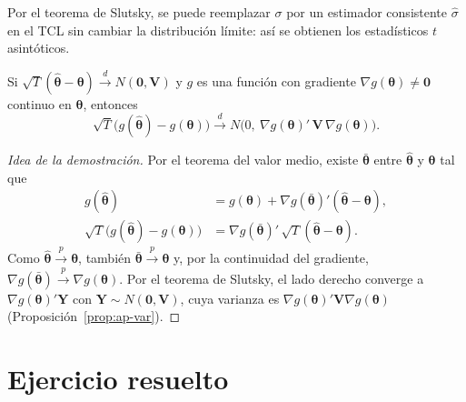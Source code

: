 Por el teorema de Slutsky, se puede reemplazar $\sigma$ por un estimador consistente $\hat\sigma$ en el
TCL sin cambiar la distribución límite: así se obtienen los estadísticos $t$ asintóticos.

\begin{teorema}\label{teo:ap-delta}
Si $\sqrt T(\hat{\bm\theta}-\bm\theta)\xrightarrow{d}N(\bm0,\bm V)$ y $g$ es una función con gradiente
$\nabla g(\bm\theta)\ne\bm0$ continuo en $\bm\theta$, entonces
\[
  \sqrt T\bigl(g(\hat{\bm\theta})-g(\bm\theta)\bigr)\xrightarrow{d}
  N\bigl(0,\ \nabla g(\bm\theta)'\,\bm V\,\nabla g(\bm\theta)\bigr).
\]
\end{teorema}

\begin{proof}[Idea de la demostración]
Por el teorema del valor medio, existe $\bar{\bm\theta}$ entre $\hat{\bm\theta}$ y $\bm\theta$ tal que
\begin{align*}
  g(\hat{\bm\theta})                     &= g(\bm\theta)+\nabla g(\bar{\bm\theta})'(\hat{\bm\theta}-\bm\theta),\\
  \sqrt T\bigl(g(\hat{\bm\theta})-g(\bm\theta)\bigr) &= \nabla g(\bar{\bm\theta})'\,\sqrt T(\hat{\bm\theta}-\bm\theta).
\end{align*}
Como $\hat{\bm\theta}\xrightarrow{p}\bm\theta$, también $\bar{\bm\theta}\xrightarrow{p}\bm\theta$ y, por la
continuidad del gradiente, $\nabla g(\bar{\bm\theta})\xrightarrow{p}\nabla g(\bm\theta)$. Por el teorema de
Slutsky, el lado derecho converge a $\nabla g(\bm\theta)'\bm Y$ con $\bm Y\sim N(\bm0,\bm V)$, cuya
varianza es $\nabla g(\bm\theta)'\bm V\nabla g(\bm\theta)$ (Proposición~\ref{prop:ap-var}).
\end{proof}

\section{Ejercicio resuelto}

